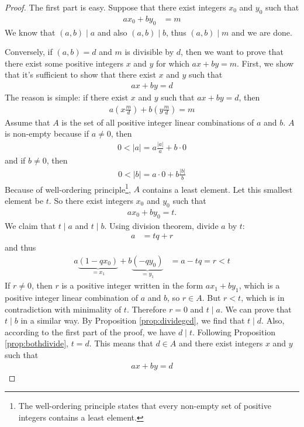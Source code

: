 \documentclass{subfile}
\begin{document}
	\begin{proof}
		The first part is easy. Suppose that there exist integers $x_0$ and $y_0$ such that
		\begin{align*}
			ax_0 + by_0
				& = m
		\end{align*}
		We know that $(a,b)\mid a$ and also $(a,b)\mid b$, thus $(a,b)\mid m$ and we are done.

		Conversely, if $(a,b)=d$ and $m$ is divisible by $d$, then we want to prove that there exist some positive integers $x$ and $y$ for which $ax+by=m$. First, we show that it's sufficient to show that there exist $x$ and $y$ such that
		\begin{align*} ax + by = d\end{align*}
		The reason is simple: if there exist $x$ and $y$ such that $ax + by = d$, then
		\begin{align*} a\left( x \frac{m}{d} \right)  + b \left( y \frac{m}{d} \right) = m\end{align*}
		Assume that $A$ is the set of all positive integer linear combinations of $a$ and $b$. $A$ is non-empty because if $a \neq 0$, then
		\begin{align*}	0<|a| = a\frac{|a|}{a} + b\cdot 0\end{align*}
		and if $b \neq 0$, then
		\begin{align*}	0<|b| =  a\cdot 0 + b \frac{|b|}{b}\end{align*}
		Because of well-ordering principle\footnote{The well-ordering principle states that every non-empty set of positive integers contains a least element.}, $A$ contains a least element. Let this smallest element be $t$. So there exist integers $x_0$ and $y_0$ such that
		\begin{align*} ax_0 + by_0 = t.\end{align*}
		We claim that $t\mid a$ and $t\mid b$. Using division theorem, divide $a$ by $t$:
		\begin{align*}
			a
				& = tq+r
		\end{align*}
		and thus
		\begin{align*}
			a\underbrace{(1-qx_0)}_{=x_1}+b\underbrace{(-qy_0)}_{=y_1}
				& =a-tq=r<t
		\end{align*}
		If $r \neq 0$, then $r$ is a positive integer written in the form $ax_1+by_1$, which is a positive integer linear combination of $a$ and $b$, so $r \in A$. But $r<t$, which is in contradiction with minimality of $t$. Therefore $r=0$ and $t\mid a$. We can prove that $t\mid b$ in a similar way. By Proposition \ref{prop:dividegcd}, we find that $t\mid d$. Also, according to the first part of the proof, we have $d\mid t$. Following Proposition \ref{prop:bothdivide}, $t=d$. This means that $d \in A$ and there exist integers $x$ and $y$ such that
		\begin{align*} ax + by = d\end{align*}
	\end{proof}
\end{document}

